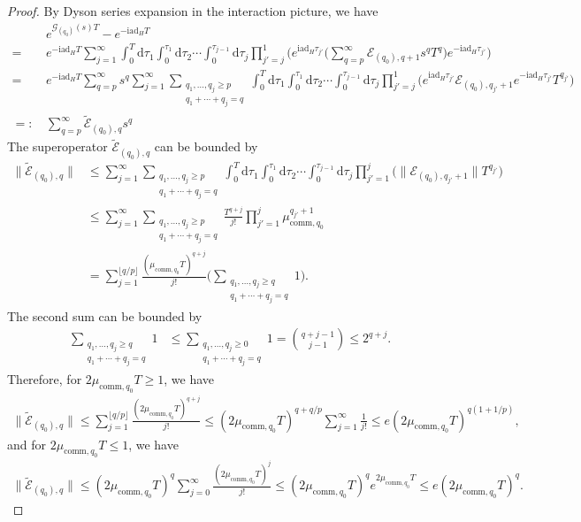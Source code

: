 \documentclass[11pt]{article}
\renewcommand{\i}{\mathrm{i}}
\renewcommand{\d}{\mathrm{d}}
\newcommand{\ad}{\mathrm{ad}}
\newcommand{\G}{\mathcal{G}}
\newcommand{\E}{\mathcal{E}}
\begin{document}
\begin{proof}
By Dyson series expansion in the interaction picture, we have 
\begin{align*}
    &e^{\G_{(q_0)}(s) T}-e^{-\i \ad_H T} \\
    = \ & e^{-\i \ad_H T}  \sum_{j=1}^{\infty} \int_{0}^T \d \tau_1 \int_{0}^{\tau_1}\d \tau_2 \cdots \int_{0}^{\tau_{j-1}}\d \tau_j \prod_{j'=j}^{1}\bigg(e^{\i\ad_H \tau_{j'}}\bigg(\sum_{q=p}^{\infty}\E_{(q_0),q+1}s^qT^q\bigg)e^{-\i \ad_H \tau_{j'}}\bigg) \\
    = \ &  e^{-\i \ad_H T}\sum_{q=p}^{\infty}s^{q} \sum_{j=1}^{\infty} \sum_{\substack{q_1,\ldots,q_j \ge p \\ q_1+\cdots+q_j=q}} \int_{0}^T \d \tau_1 \int_{0}^{\tau_1}\d \tau_2 \cdots \int_{0}^{\tau_{j-1}}\d \tau_j \prod_{j'=j}^{1}\bigg(e^{\i\ad_H \tau_{j'}}\E_{(q_0),q_{j'}+1}e^{-\i \ad_H \tau_{j'}}T^{q_{j'}}\bigg)\\
    =:\,& \sum_{q=p}^{\infty}\tilde{\E}_{(q_0),q} s^q   
\end{align*}
The superoperator $\tilde{\E}_{(q_0),q}$ can be bounded by \begin{align*}
    \big\|\tilde{\E}_{(q_0),q}\big\|&\le \sum_{j=1}^{\infty} \sum_{\substack{q_1,\ldots,q_j \ge p \\ q_1+\cdots+q_j=q}} \int_{0}^T \d \tau_1 \int_{0}^{\tau_1}\d \tau_2 \cdots \int_{0}^{\tau_{j-1}}\d \tau_j \prod_{j'=1}^{j}\big(\big\|\E_{(q_0),q_{j'}+1}\big\|T^{q_{j'}}\big) \\
    &\le  \sum_{j=1}^{\infty} \sum_{\substack{q_1,\ldots,q_j \ge p \\ q_1+\cdots+q_j=q}}\frac{T^{q+j}}{j!}\prod_{j'=1}^{j}\mu_{\mathrm{comm},q_0}^{q_{j'}+1} \\
    &=\sum_{j=1}^{\lfloor q/p\rfloor }\frac{(\mu_{\mathrm{comm},q_0}T)^{q+j}}{j!}\Big(\sum_{\substack{q_1,\ldots,q_j \ge q \\ q_1+\cdots+q_j=q}} 1\Big).
\end{align*}
The second sum can be bounded by \begin{align*}
    \sum_{\substack{q_1,\ldots,q_j \ge q \\ q_1+\cdots+q_j=q}} 1 &\le \sum_{\substack{ q_1,\ldots,q_j \ge 0 \\ q_1+\cdots+q_j=q}} 1=\binom{q+j-1}{j-1} \le 2^{q+j}.
\end{align*}
Therefore, for $2\mu_{\mathrm{comm},q_0}T\ge 1$, we have \begin{align*}
    \big\|\tilde{\E}_{(q_0),q}\big\|\le \sum_{j=1}^{\lfloor q/p\rfloor }\frac{(2\mu_{\mathrm{comm},q_0}T)^{q+j}}{j!} 
    \le (2\mu_{\mathrm{comm},q_0}T)^{q+q/p}\sum_{j=1}^{\infty}\frac{1}{j!}\le e(2\mu_{\mathrm{comm},q_0}T)^{q(1+1/p)} ,
\end{align*}
and for $2\mu_{\mathrm{comm},q_0}T\le 1$, we have \begin{align*}
    \big\|\tilde{\E}_{(q_0),q}\big\| \le (2\mu_{\mathrm{comm},q_0}T)^{q}\sum_{j=0}^{\infty}\frac{ (2\mu_{\mathrm{comm},q_0}T)^{j}}{j!}\le (2\mu_{\mathrm{comm},q_0}T)^{q} e^{2\mu_{\mathrm{comm},q_0}T}\le e(2\mu_{\mathrm{comm},q_0}T)^{q}.
\end{align*}
\end{proof}
\end{document}
